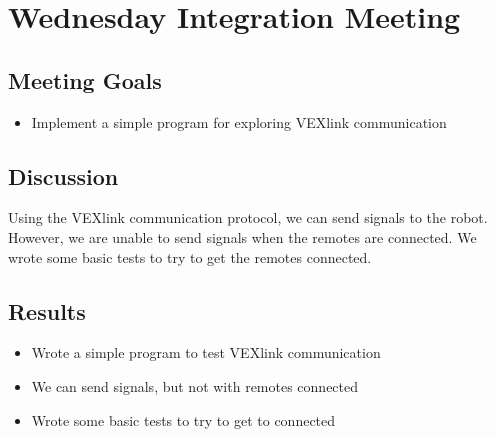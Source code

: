 \section{Wednesday Integration Meeting}

\subsection{Meeting Goals}
\begin{itemize}
    \item Implement a simple program for exploring VEXlink communication
\end{itemize}

\subsection{Discussion}
Using the VEXlink communication protocol, we can send signals to the robot. However, we are unable to send signals when the remotes are connected. We wrote some basic tests to try to get the remotes connected.

\subsection{Results}
\begin{itemize}
    \item Wrote a simple program to test VEXlink communication
    \item We can send signals, but not with remotes connected
    \item Wrote some basic tests to try to get to connected
\end{itemize}
